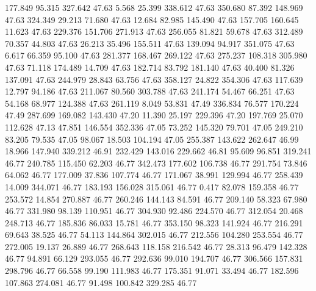  177.849   95.315  327.642        47.63
   5.568   25.399  338.612        47.63
 350.680   87.392  148.969        47.63
 324.349   29.213   71.680        47.63
  12.684   82.985  145.490        47.63
 157.705  160.645   11.623        47.63
 229.376  151.706  271.913        47.63
 256.055   81.821   59.678        47.63
 312.489   70.357   44.803        47.63
  26.213   35.496  155.511        47.63
 139.094   94.917  351.075        47.63
   6.617   66.359   95.100        47.63
 281.377  168.467  269.122        47.63
 275.237  108.318  305.980        47.63
  71.118  174.489   14.709        47.63
 182.714   83.792  181.140        47.63
  40.400   81.326  137.091        47.63
 244.979   28.843   63.756        47.63
 358.127   24.822  354.306        47.63
 117.639   12.797   94.186        47.63
 211.067   80.560  303.788        47.63
 241.174   54.467   66.251        47.63
  54.168   68.977  124.388        47.63
 261.119    8.049   53.831        47.49
 336.834   76.577  170.224        47.49
 287.699  169.082  143.430        47.20
  11.390   25.197  229.396        47.20
 197.769   25.070  112.628        47.13
  47.851  146.554  352.336        47.05
  73.252  145.320   79.701        47.05
 249.210   83.205   79.535        47.05
  98.067   18.503  104.194        47.05
 255.387  143.622  262.647        46.99
  18.966  147.940  339.212        46.91
 232.429  143.016  229.662        46.81
  95.609   96.851  319.241        46.77
 240.785  115.450   62.203        46.77
 342.473  177.602  106.738        46.77
 291.754   73.846   64.062        46.77
 177.009   37.836  107.774        46.77
 171.067   38.991  129.994        46.77
 258.439   14.009  344.071        46.77
 183.193  156.028  315.061        46.77
   0.417   82.078  159.358        46.77
 253.572   14.854  270.887        46.77
 260.246  144.143   84.591        46.77
 209.140   58.323   67.980        46.77
 331.980   98.139  110.951        46.77
 304.930   92.486  224.570        46.77
 312.054   20.468  248.713        46.77
 185.836   86.033   15.781        46.77
 353.150   98.323  141.924        46.77
 216.291   69.643   38.525        46.77
  54.113  144.864  302.015        46.77
 212.556  104.280  253.554        46.77
 272.005   19.137   26.889        46.77
 268.643  118.158  216.542        46.77
  28.313   96.479  142.328        46.77
  94.891   66.129  293.055        46.77
 292.636   99.010  194.707        46.77
 306.566  157.831  298.796        46.77
  66.558   99.190  111.983        46.77
 175.351   91.071   33.494        46.77
 182.596  107.863  274.081        46.77
  91.498  100.842  329.285        46.77
